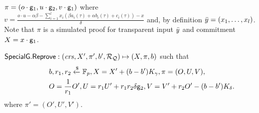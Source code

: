 {\begin{definition}
\begin{itemize}
$\pi = (o \cdot \mathsf{g}_1, u  \cdot \mathsf{g}_2 , v \cdot \mathsf{g}_1)$ where \\ $v = \frac{o\cdot u - \alpha \beta - \sum_{i=1}^{l} x_i (\beta a_i(\tau)+ \alpha b_i(\tau)+ c_i(\tau))- x}{\delta}  $ and, 
by definition $\bar{y} = (x_1, \ldots, x_l)$. Note that $\pi$ is a simulated proof for transparent input $\bar{y}$ 
and commitment $X = x \cdot \mathsf{g}_1$.
\end{itemize} 
\end{definition}}{${\mathsf{SpecialG}}.{\mathsf{Reprove}}: (\mathit{crs}, X', \pi', b', \mathcal{R}_{\mathcal{Q}}) \mapsto (X, \pi, b)$  such that
\begin{align*}
&\ \ \ \ \ \ \ \  b , r_1, r_2  \xleftarrow{\$} \mathbb{F}_p, X = X' + (b- b') K_{\gamma}, \pi = (O, U, V), \\
&\ \ \ \ \ \ \ \ O = \frac{1}{r_1} O', U = r_1 U' + r_1r_2 \delta \mathsf{g}_2, V = V' + r_2O'  - (b - b') K_{\delta} .
\end{align*}
\noindent where $\pi' = (O', U', V')$.}




